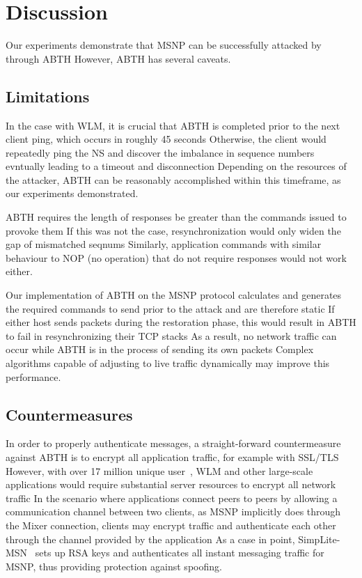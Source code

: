 \documentclass{sig-alternate}
\begin{document}
\section{Discussion}

Our experiments demonstrate that MSNP can be successfully attacked by through ABTH
However, ABTH has several caveats.

\subsection{Limitations}

In the case with WLM, it is crucial that ABTH is completed prior to the next client ping, which occurs in roughly 45 seconds
Otherwise, the client would repeatedly ping the NS and discover the imbalance in sequence numbers evntually leading to a timeout and disconnection
Depending on the resources of the attacker, ABTH can be reasonably accomplished within this timeframe, as our experiments demonstrated.

ABTH requires the length of responses be greater than the commands issued to provoke them
If this was not the case, resynchronization would only widen the gap of mismatched seqnums
Similarly, application commands with similar behaviour to NOP (no operation) that do not require responses would not work either.

Our implementation of ABTH on the MSNP protocol calculates and generates the required commands to send prior to the attack and are therefore static
If either host sends packets during the restoration phase, this would result in ABTH to fail in resynchronizing their TCP stacks
As a result, no network traffic can occur while ABTH is in the process of sending its own packets
Complex algorithms capable of adjusting to live traffic dynamically may improve this performance.

\subsection{Countermeasures}

In order to properly authenticate messages, a straight-forward countermeasure against ABTH is to encrypt all application traffic, for example with SSL/TLS
However, with over 17 million unique user~\cite{templeton:spoof}, WLM and other large-scale applications would require substantial server resources to encrypt all network traffic
In the scenario where applications connect peers to peers by allowing a communication channel between two clients, as MSNP implicitly does through the Mixer connection, clients may encrypt traffic and authenticate each other through the channel provided by the application
As a case in point, SimpLite-MSN~\cite{secway:url} sets up RSA keys and authenticates all instant messaging traffic for MSNP, thus providing protection against spoofing.
\end{document}
